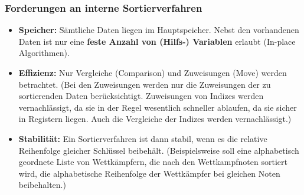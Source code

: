 \subsubsection{Forderungen an interne Sortierverfahren}
\begin{itemize}
    \item \textbf{Speicher:} Sämtliche Daten liegen im Hauptspeicher. Nebst den vorhandenen Daten ist nur eine \textbf{feste Anzahl von (Hilfs-) Variablen} erlaubt (In-place Algorithmen).
    \item \textbf{Effizienz:} Nur Vergleiche (Comparison) und Zuweisungen (Move) werden betrachtet.
    (Bei den Zuweisungen werden nur die Zuweisungen der zu sortierenden Daten berücksichtigt. Zuweisungen von Indizes werden vernachlässigt, da sie in der Regel wesentlich schneller ablaufen, da sie sicher in Registern liegen. Auch die Vergleiche der Indizes werden vernachlässigt.)
    \item \textbf{Stabilität:} Ein Sortierverfahren ist dann stabil, wenn es die relative Reihenfolge gleicher Schlüssel beibehält. (Beispielsweise soll eine alphabetisch geordnete Liste von Wettkämpfern, die nach den Wettkampfnoten sortiert wird, die alphabetische Reihenfolge der Wettkämpfer bei gleichen Noten beibehalten.)
\end{itemize}

